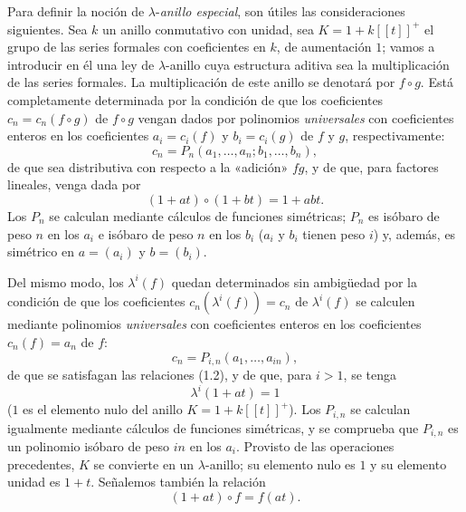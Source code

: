 Para definir la noción de $\lambda$-\emph{anillo especial}, son útiles las consideraciones siguientes. Sea $k$ un anillo conmutativo con unidad, sea $K=1+k[[t]]^+$ el grupo de las series formales con coeficientes en $k$, de aumentación $1$; vamos a introducir en él una ley de $\lambda$-anillo cuya estructura aditiva sea la multiplicación de las series formales. La multiplicación de este anillo se denotará por $f\circ g$. Está completamente determinada por la condición de que los coeficientes $c_n=c_n(f\circ g)$ de $f\circ g$ vengan dados por polinomios \emph{universales} con coeficientes enteros en los coeficientes $a_i=c_i(f)$ y $b_i=c_i(g)$ de $f$ y $g$, respectivamente:
\begin{equation}\tag{1.6}
c_n=P_n(a_1,\ldots,a_n;b_1,\ldots,b_n),
\end{equation}
de que sea distributiva con respecto a la «adición» $fg$, y de que, para factores lineales, venga dada por
\begin{equation}\tag{1.7}
(1+at)\circ(1+bt)=1+abt.
\end{equation}
Los $P_n$ se calculan mediante cálculos de funciones simétricas; $P_n$ es isóbaro de peso $n$ en los $a_i$ e isóbaro de peso $n$ en los $b_i$ ($a_i$ y $b_i$ tienen peso $i$) y, además, es simétrico en $a=(a_i)$ y $b=(b_i)$.

Del mismo modo, los $\lambda^i(f)$ quedan determinados sin ambigüedad por la condición de que los coeficientes $c_n(\lambda^i(f))=c_n\text{ de }\lambda^i(f)$ se calculen mediante polinomios \emph{universales} con coeficientes enteros en los coeficientes $c_n(f)=a_n$ de $f$:
\begin{equation}\tag{1.8}
c_n=P_{i,n}(a_1,\ldots,a_{in}),
\end{equation}
de que se satisfagan las relaciones (1.2), y de que, para $i>1$, se tenga
\begin{equation}\tag{1.9}
\lambda^i(1+at)=1
\end{equation}
($1$ es el elemento nulo del anillo $K=1+k[[t]]^+$). Los $P_{i,n}$ se calculan igualmente mediante cálculos de funciones simétricas, y se comprueba que $P_{i,n}$ es un polinomio isóbaro de peso $in$ en los $a_i$. Provisto de las operaciones precedentes, $K$ se convierte en un $\lambda$-anillo; su elemento nulo es $1$ y su elemento unidad es $1+t$. Señalemos también la relación
\begin{equation}\tag{1.7 bis}
(1+at)\circ f=f(at).
\end{equation}

